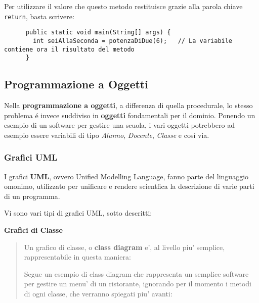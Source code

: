 \documentclass{article}
\begin{document}
{    Per utilizzare il valore che questo metodo restituisce grazie alla parola chiave \texttt{return}, basta scrivere:

    \begin{verbatim}
      public static void main(String[] args) {
        int seiAllaSeconda = potenzaDiDue(6);   // La variabile contiene ora il risultato del metodo
      }
    \end{verbatim}

    \subsection{Programmazione a Oggetti}
    Nella \textbf{programmazione a oggetti}, a differenza di quella procedurale, lo stesso problema é invece suddiviso in \textbf{oggetti} fondamentali per il dominio. Ponendo un esempio di un software per gestire una scuola, i vari oggetti potrebbero ad esempio essere variabili di tipo \textit{Alunno}, \textit{Docente}, \textit{Classe} e cosí via.

    \subsubsection{Grafici UML} %
    I grafici \textbf{UML}, ovvero Unified Modelling Language, fanno parte del linguaggio omonimo, utilizzato per unificare e rendere scientfica la descrizione di varie parti di un programma.

    Vi sono vari tipi di grafici UML, sotto descritti:

    \textbf{Grafici di Classe}
    \begin{quote}
      Un grafico di classe, o \textbf{class diagram} e', al livello piu' semplice, rappresentabile in questa maniera:


      Segue un esempio di class diagram che rappresenta un semplice software per gestire un menu' di un ristorante, ignorando per il momento i metodi di ogni classe, che verranno spiegati piu' avanti:

\end{quote}}
\end{document}
